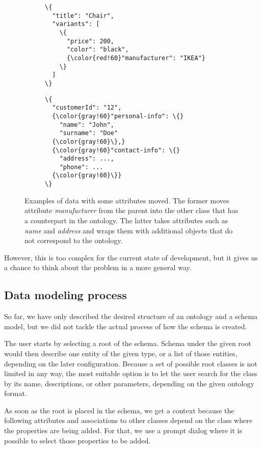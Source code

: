 \begin{figure}[h!]\centering
  \begin{subfigure}[b]{.5\textwidth}
    \begin{Verbatim}[commandchars=\\\{\}]
\{
  "title": "Chair",
  "variants": [
    \{
      "price": 200,
      "color": "black",
      {\color{red!60}"manufacturer": "IKEA"}
    \}
  ]
\}
    \end{Verbatim}
  \end{subfigure}%
  \begin{subfigure}[b]{.5\textwidth}
    \begin{Verbatim}[commandchars=\\\{\}]
\{
  "customerId": "12",
  {\color{gray!60}"personal-info": \{}
    "name": "John",
    "surname": "Doe"
  {\color{gray!60}\},}
  {\color{gray!60}"contact-info": \{}
    "address": ...,
    "phone": ...
  {\color{gray!60}\}}
\}
    \end{Verbatim}
    \end{subfigure}%
  \caption{Examples of data with some attributes moved. The former moves attribute \textit{manufacturer} from the parent into the other class that has a counterpart in the ontology. The latter takes attributes such as \textit{name} and \textit{address} and wraps them with additional objects that do not correspond to the ontology.}
\end{figure}

However, this is too complex for the current state of development, but it gives us a chance to think about the problem in a more general way.

\subsection{Data modeling process}

So far, we have only described the desired structure of an ontology and a schema model, but we did not tackle the actual process of how the schema is created.

The user starts by selecting a root of the schema. Schema under the given root would then describe one entity of the given type, or a list of those entities, depending on the later configuration. Because a set of possible root classes is not limited in any way, the most suitable option is to let the user search for the class by its name, descriptions, or other parameters, depending on the given ontology format.

As soon as the root is placed in the schema, we get a context because the following attributes and associations to other classes depend on the class where the properties are being added. For that, we use a prompt dialog where it is possible to select those properties to be added.

